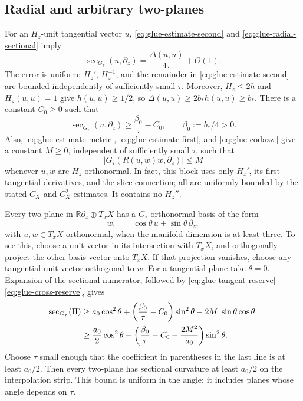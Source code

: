 \documentclass[12pt]{amsart}
\numberwithin{equation}{section}
\theoremstyle{remark}
\newcommand{\Rr}{\mathbb R}
\newcommand{\Ksec}{\operatorname{sec}}
\begin{document}
\subsection{Radial and arbitrary two-planes}
For an \(H_z\)-unit tangential vector \(u\),
\eqref{eq:glue-estimate-second} and
\eqref{eq:glue-radial-sectional} imply
\[
 \Ksec_{G_\tau}(u,\partial_z)
 =\frac{\Delta(u,u)}{4\tau}+O(1).
\]
The error is uniform: \(H_z'\), \(H_z^{-1}\), and the
remainder in \eqref{eq:glue-estimate-second} are bounded
independently of sufficiently small \(\tau\). Moreover,
\(H_z\le2h\) and \(H_z(u,u)=1\) give \(h(u,u)\ge1/2\),
so \(\Delta(u,u)\ge2b_*h(u,u)\ge b_*\). There is a constant
\(C_0\ge0\)
such that
\begin{equation}\label{eq:glue-radial-reserve}
 \Ksec_{G_\tau}(u,\partial_z)
       \ge\frac{\beta_0}{\tau}-C_0,
 \qquad \beta_0:=b_*/4>0.
\end{equation}
Also, \eqref{eq:glue-estimate-metric},
\eqref{eq:glue-estimate-first}, and
\eqref{eq:glue-codazzi} give a constant \(M\ge0\),
independent of sufficiently small \(\tau\), such that
\begin{equation}\label{eq:glue-cross-reserve}
 \bigl|G_\tau(R(u,w)w,\partial_z)\bigr|\le M
\end{equation}
whenever \(u,w\) are \(H_z\)-orthonormal. In fact, this block
uses only \(H_z'\), its first tangential derivatives, and the
slice connection; all are uniformly bounded by the stated
\(C_X^1\) and \(C_X^2\) estimates. It contains no \(H_z''\).

Every two-plane in \(\Rr\partial_z\oplus T_xX\) has a
\(G_\tau\)-orthonormal basis of the form
\[
 w,\qquad \cos\theta\,u+\sin\theta\,\partial_z,
\]
with \(u,w\in T_xX\) orthonormal, when the manifold dimension
is at least three. To see this, choose a unit vector in its
intersection with \(T_xX\), and orthogonally project the
other basis vector onto \(T_xX\). If that projection vanishes,
choose any tangential unit vector orthogonal to \(w\). For a
tangential plane take \(\theta=0\). Expansion of the sectional
numerator, followed by \eqref{eq:glue-tangent-reserve}--
\eqref{eq:glue-cross-reserve}, gives
\begin{align}
 \Ksec_{G_\tau}(\Pi)
 &\ge a_0\cos^2\theta
      +\left(\frac{\beta_0}{\tau}-C_0\right)\sin^2\theta
      -2M|\sin\theta\cos\theta|\notag\\
 &\ge\frac{a_0}{2}\cos^2\theta
      +\left(\frac{\beta_0}{\tau}-C_0-\frac{2M^2}{a_0}\right)
        \sin^2\theta.
 \label{eq:glue-all-planes}
\end{align}
Choose \(\tau\) small enough that the coefficient in parentheses
in the last line is at least \(a_0/2\). Then every two-plane
has sectional curvature at least \(a_0/2\) on the interpolation
strip. This bound is uniform in the angle; it includes planes
whose angle depends on \(\tau\).
\end{document}
